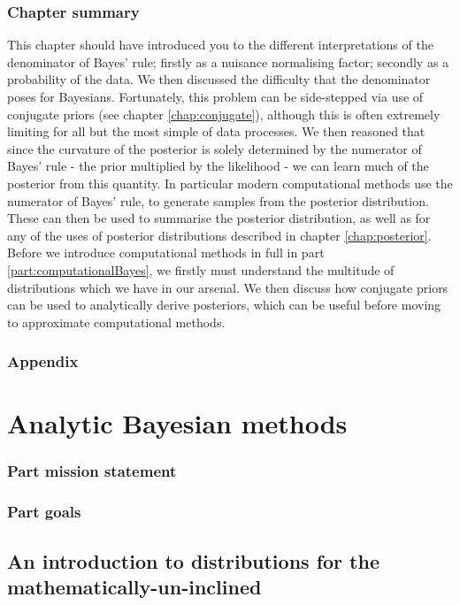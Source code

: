 \documentclass[11pt,fullpage]{book}
\begin{document}
\section{Chapter summary}
This chapter should have introduced you to the different interpretations of the denominator of Bayes' rule; firstly as a nuisance normalising factor; secondly as a probability of the data. We then discussed the difficulty that the denominator poses for Bayesians. Fortunately, this problem can be side-stepped via use of conjugate priors (see chapter \ref{chap:conjugate}), although this is often extremely limiting for all but the most simple of data processes. We then reasoned that since the curvature of the posterior is solely determined by the numerator of Bayes' rule - the prior multiplied by the likelihood - we can learn much of the posterior from this quantity. In particular modern computational methods use the numerator of Bayes' rule, to generate samples from the posterior distribution. These can then be used to summarise the posterior distribution, as well as for any of the uses of posterior distributions described in chapter \ref{chap:posterior}. Before we introduce computational methods in full in part \ref{part:computationalBayes}, we firstly must understand the multitude of distributions which we have in our arsenal. We then discuss how conjugate priors can be used to analytically derive posteriors, which can be useful before moving to approximate computational methods.

\section{Appendix}\label{sec:Denominator_appendix}

\part{Analytic Bayesian methods}\label{part:analyticalBayes}
\section{Part mission statement}
\section{Part goals}

\chapter{An introduction to distributions for the mathematically-un-inclined}\label{chap:distributions}
\end{document}

